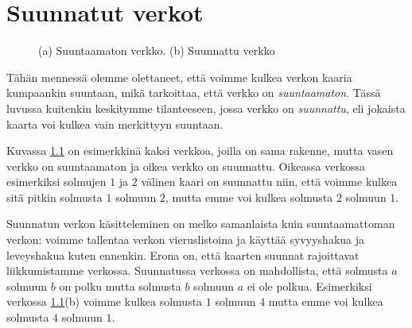 \chapter{Suunnatut verkot}

\begin{figure}
\center
\begin{center}
\end{center}
\caption{(a) Suuntaamaton verkko. (b) Suunnattu verkko}
\label{fig:versuu}
\end{figure}

Tähän mennessä olemme olettaneet,
että voimme kulkea verkon kaaria kumpaankin suuntaan,
mikä tarkoittaa, että verkko on \emph{suuntaamaton}.
Tässä luvussa kuitenkin keskitymme tilanteeseen,
jossa verkko on \emph{suunnattu}, eli jokaista kaarta
voi kulkea vain merkittyyn suuntaan.

Kuvassa \ref{fig:versuu} on esimerkkinä kaksi verkkoa,
joilla on sama rakenne, mutta vasen verkko on
suuntaamaton ja oikea verkko on suunnattu.
Oikeassa verkossa esimerkiksi solmujen $1$ ja $2$
välinen kaari on suunnattu niin, että voimme kulkea
sitä pitkin solmusta $1$ solmuun $2$,
mutta emme voi kulkea solmusta $2$ solmuun $1$.

Suunnatun verkon käsitteleminen on melko samanlaista
kuin suuntaamattoman verkon:
voimme tallentaa verkon vieruslistoina ja käyttää
syvyyshakua ja leveyshakua kuten ennenkin.
Erona on, että kaarten suunnat rajoittavat
liikkumistamme verkossa.
Suunnatussa verkossa on mahdollista, että solmusta
$a$ solmuun $b$ on polku mutta solmusta
$b$ solmuun $a$ ei ole polkua.
Esimerkiksi verkossa \ref{fig:versuu}(b)
voimme kulkea solmusta $1$ solmuun $4$
mutta emme voi kulkea solmusta $4$ solmuun $1$.

